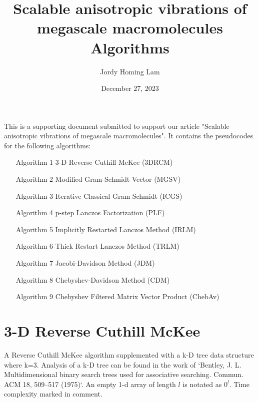 \documentclass[a4paper]{article}
\title{Scalable anisotropic vibrations of megascale macromolecules \protect\\ Algorithms \protect\\}
\author{Jordy Homing Lam}
\date{December 27, 2023}
\begin{document}
\maketitle

This is a supporting document submitted to support our article "Scalable anisotropic vibrations of megascale macromolecules". It contains the pseudocodes for the following algorithms:
\begin{itemize}
\item [Algorithm 1] 3-D Reverse Cuthill McKee (3DRCM)
\item [Algorithm 2] Modified Gram-Schmidt Vector (MGSV)
\item [Algorithm 3] Iterative Classical Gram-Schmidt (ICGS)
\item [Algorithm 4] p-step Lanczos Factorization (PLF)
\item [Algorithm 5] Implicitly Restarted Lanczos Method (IRLM)
\item [Algorithm 6] Thick Restart Lanczos Method (TRLM)
\item [Algorithm 7] Jacobi-Davidson Method (JDM)
\item [Algorithm 8] Chebyshev-Davidson Method (CDM)
\item [Algorithm 9] Chebyshev Filtered Matrix Vector Product (ChebAv)
\end{itemize}











\pagebreak







\section{3-D Reverse Cuthill McKee}

A Reverse Cuthill McKee algorithm supplemented with a k-D tree data structure where k=3. Analysis of a k-D tree can be found in the work of `Bentley, J. L. Multidimensional binary search trees used for associative searching. Commun. ACM 18, 509–517 (1975)`. An empty 1-d array of length $l$ is notated as $0^l$. Time complexity marked in comment.
\end{document}

